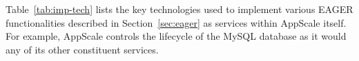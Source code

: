 
%

Table~\ref{tab:imp-tech} lists the key technologies used to implement various EAGER functionalities described in
Section~\ref{sec:eager} as services within AppScale itself.  For example, AppScale
controls the lifecycle of the MySQL database as it would any of its other
constituent services.
